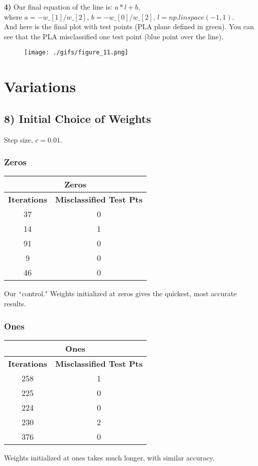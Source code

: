 \documentclass{article}
\begin{document}
\textbf{4)} Our final equation of the line is: $a * l + b$, \\
\hspace{2em} where $a = -w\_[1] / w\_[2]$, $b = -w\_[0] / w\_[2]$, $l = np.linspace(-1,1)$. \\

And here is the final plot with test points (PLA plane defined in green). You can see that the PLA misclassified one 
test point (blue point over the line). 

\begin{figure}[h]
	\centering
	\texttt{[image: ./gifs/figure\_11.png]}
\end{figure}

\newpage
\section*{Variations}
\subsection*{8) Initial Choice of Weights}
Step size, $c = 0.01$.

\subsubsection*{Zeros}
\begin{center}
\begin{tabular}{|c|c|}
	\hline
	\multicolumn{2}{|c|}{\textbf{Zeros}} \\\hline
	\textbf{Iterations} & \textbf{Misclassified Test Pts} \\\hline
	37 & 0 \\
	14 & 1\\
	91 & 0 \\
	9 & 0\\
	46 & 0\\
	\hline
\end{tabular}
\end{center}
Our ``control." Weights initialized at zeros gives the quickest, most accurate results. \\

\subsubsection*{Ones}
\begin{center}
\begin{tabular}{|c|c|}
	\hline
	\multicolumn{2}{|c|}{\textbf{Ones}} \\\hline
	\textbf{Iterations} & \textbf{Misclassified Test Pts} \\\hline
	258 & 1 \\
	225 & 0\\
	224 & 0 \\
	230 & 2\\
	376 & 0\\
	\hline
\end{tabular}
\end{center}
Weights initialized at ones takes much longer, with similar accuracy. \\
\end{document}
